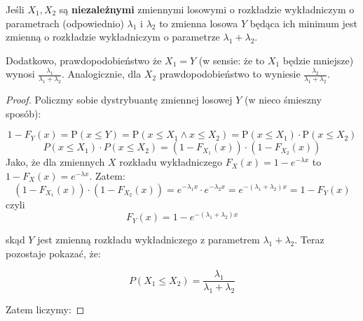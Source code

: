 \begin{theorem}[Lemat 8.5 P\&C]
	\label{lemat8.5}
	Jeśli \(X_1, X_2\) są \textbf{niezależnymi} zmiennymi losowymi o rozkładzie wykładniczym o parametrach (odpowiednio) \(\lambda_1\) i \(\lambda_2\) to zmienna losowa \(Y\) będąca ich minimum jest zmienną o rozkładzie wykładniczym o parametrze \( \lambda_1 + \lambda_2 \).

	Dodatkowo, prawdopodobieństwo że \(X_1 = Y\) (w sensie: że to \(X_1\) będzie mniejsze) wynosi \( \frac{\lambda_1}{\lambda_1 + \lambda_2} \). Analogicznie, dla \(X_2\) prawdopodobieństwo to wyniesie \( \frac{\lambda_2}{\lambda_1 + \lambda_2} \).
\end{theorem}

\begin{proof}
	Policzmy sobie dystrybuantę zmiennej losowej \(Y\) (w nieco śmieszny sposób):

	\[
		1 - F_Y(x) = \mathrm{P}(x \leq Y) = \mathrm{P}(x \leq X_1 \land x \leq X_2) = \mathrm{P}(x \leq X_1) \cdot \mathrm{P}(x \leq X_2)
	\]
	\[
		P(x \leq X_1) \cdot P(x \leq X_2) = (1 - F_{X_1}(x)) \cdot (1 - F_{X_2}(x))
	\]
	Jako, że dla zmiennych \(X\) rozkładu wykładniczego \(F_{X}(x) = 1 - e^{- \lambda x}\) to \(1 - F_{X}(x) = e^{-\lambda x}\). Zatem:
	\[
		(1 - F_{X_1}(x)) \cdot (1 - F_{X_2}(x)) = e^{-\lambda_1 x} \cdot e^{-\lambda_2 x} = e^{-(\lambda_1 + \lambda_2)x} = 1 - F_Y(x)
	\]
	czyli
	\[
		F_Y(x) = 1 - e^{-(\lambda_1 + \lambda_2)x}
	\]

	skąd \(Y\) jest zmienną rozkładu wykładniczego z parametrem \( \lambda_1 + \lambda_2\). Teraz pozostaje pokazać, że:

	\[
		P(X_1 \leq X_2) = \frac{\lambda_1}{\lambda_1 + \lambda_2}
	\]

	Zatem liczymy:


\end{proof}
